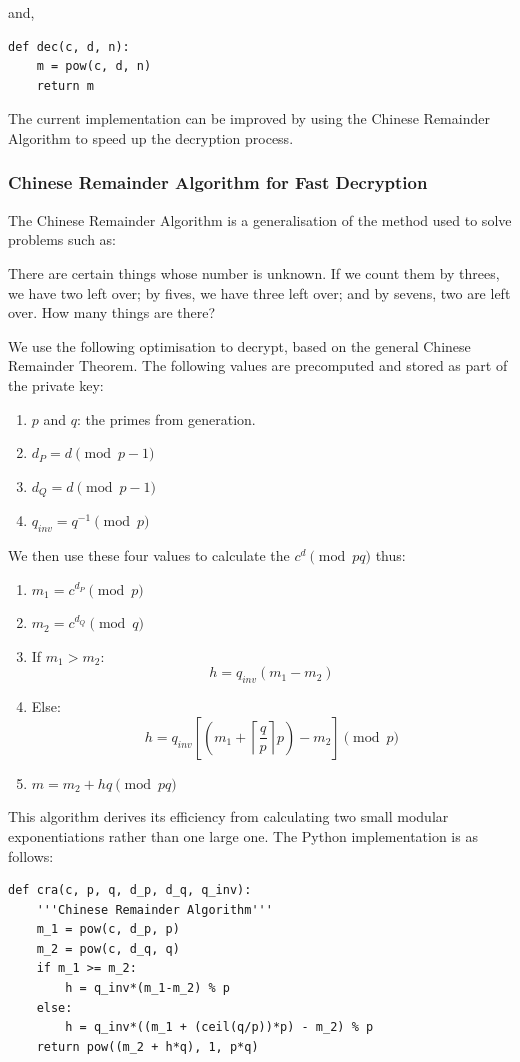 \documentclass{article}
\begin{document}
and,

\begin{verbatim}
def dec(c, d, n):
    m = pow(c, d, n)
    return m
\end{verbatim}

The current implementation can be improved by using the Chinese Remainder Algorithm to speed up the
decryption process.

\subsubsection{Chinese Remainder Algorithm for Fast Decryption}
The Chinese Remainder Algorithm is a generalisation of the method used to solve problems such as:
\begin{displayquote}
There are certain things whose number is unknown. If we count them by threes, we have two left over;
by fives, we have three left over; and by sevens, two are left over. How many things are there?
\end{displayquote}
We use the following optimisation to decrypt, based on the general Chinese Remainder Theorem. The
following values are precomputed and stored as part of the private key:
\begin{enumerate}
\item $p$ and $q$: the primes from generation.
\item $d_P = d \pmod{p-1}$
\item $d_Q = d \pmod{p-1}$
\item $q_{inv} = q^{-1} \pmod{p}$
\end{enumerate}

We then use these four values to calculate the $c^d \pmod{pq}$ thus:
\begin{enumerate}
\item $m_1 = c^{d_P} \pmod{p}$
\item $m_2 = c^{d_Q} \pmod{q}$
\item If $m_1 > m_2$: $$h = q_{inv}(m_1 - m_2)$$
\item Else: $$h = q_{inv}[(m_1 + \left \lceil{\frac{q}{p}}\right \rceil p) - m_2] \pmod{p}$$
\item $m = m_2 + hq \pmod{pq}$
\end{enumerate}

This algorithm derives its efficiency from calculating two small modular exponentiations rather than
one large one. The Python implementation is as follows:
\begin{verbatim}
def cra(c, p, q, d_p, d_q, q_inv):
    '''Chinese Remainder Algorithm'''
    m_1 = pow(c, d_p, p)
    m_2 = pow(c, d_q, q)
    if m_1 >= m_2:
        h = q_inv*(m_1-m_2) % p
    else:
        h = q_inv*((m_1 + (ceil(q/p))*p) - m_2) % p
    return pow((m_2 + h*q), 1, p*q)
\end{verbatim}
\end{document}
